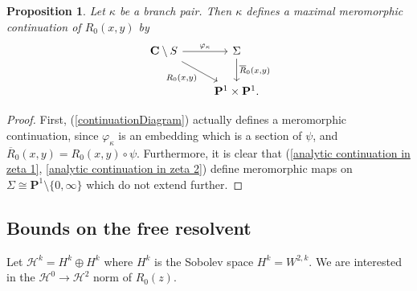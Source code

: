 \documentclass[reqno,12pt,letterpaper]{amsart}
\newcommand{\CC}{\mathbf{C}}
\newcommand{\PP}{\mathbf P}
\newtheorem{proposition}[theorem]{Proposition}
\theoremstyle{definition}
\begin{document}
\begin{proposition}
Let $\kappa$ be a branch pair. Then $\kappa$ defines a maximal meromorphic continuation of $R_0(x, y)$ by
\begin{equation}\begin{tikzcd}\label{continuationDiagram}
\CC \setminus S \arrow["\varphi_\kappa", r] \arrow["R_0{(x, y)}", dr, swap] & \Sigma \arrow["\overline R_0{(x, y)}", d] \\
& \PP^1 \times \PP^1.
\end{tikzcd}\end{equation}
\end{proposition}
\begin{proof}
First, (\ref{continuationDiagram}) actually defines a meromorphic continuation, since $\varphi_\kappa$ is an embedding which is a section of $\psi$, and $\overline R_0(x, y) = R_0(x, y) \circ \psi$.
Furthermore, it is clear that (\ref{analytic continuation in zeta 1}, \ref{analytic continuation in zeta 2}) define meromorphic maps on $\Sigma \cong \PP^1 \setminus \{0, \infty\}$ which do not extend further.
\end{proof}


\subsection{Bounds on the free resolvent}
Let $\mathcal H^k = H^k \oplus H^k$ where $H^k$ is the Sobolev space $H^k = W^{2,k}$.
We are interested in the $\mathcal H^0 \to \mathcal H^2$ norm of $R_0(z)$.
\end{document}
